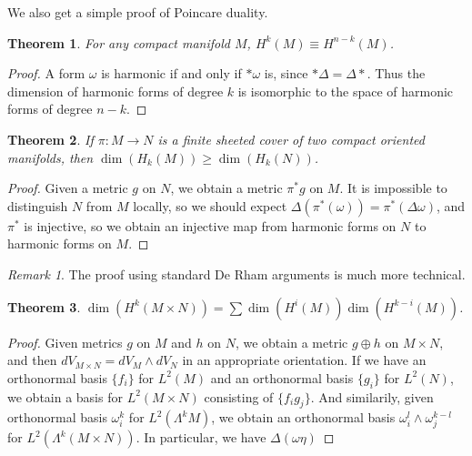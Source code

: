 \documentclass{article}
\theoremstyle{plain}
\newtheorem{theorem}{Theorem}
\theoremstyle{remark}
\newtheorem*{remark}{Remark}
\theoremstyle{definition}
\begin{document}
We also get a simple proof of Poincare duality.

\begin{theorem}
    For any compact manifold $M$, $H^k(M) \equiv H^{n-k}(M)$.
\end{theorem}
\begin{proof}
    A form $\omega$ is harmonic if and only if $* \omega$ is, since $* \Delta = \Delta *$. Thus the dimension of harmonic forms of degree $k$ is isomorphic to the space of harmonic forms of degree $n-k$.
\end{proof}

\begin{theorem}
    If $\pi: M \to N$ is a finite sheeted cover of two compact oriented manifolds, then $\dim(H_k(M)) \geq \dim(H_k(N))$.
\end{theorem}
\begin{proof}
    Given a metric $g$ on $N$, we obtain a metric $\pi^* g$ on $M$. It is impossible to distinguish $N$ from $M$ locally, so we should expect $\Delta(\pi^*(\omega)) = \pi^*(\Delta \omega)$, and $\pi^*$ is injective, so we obtain an injective map from harmonic forms on $N$ to harmonic forms on $M$.
\end{proof}

\begin{remark}
    The proof using standard De Rham arguments is much more technical.
\end{remark}

\begin{theorem}
    $\dim(H^k(M \times N)) = \sum \dim(H^i(M)) \dim(H^{k-i}(M))$.
\end{theorem}
\begin{proof}
    Given metrics $g$ on $M$ and $h$ on $N$, we obtain a metric $g \oplus h$ on $M \times N$, and then $dV_{M \times N} = dV_M \wedge dV_N$ in an appropriate orientation. If we have an orthonormal basis $\{ f_i \}$ for $L^2(M)$ and an orthonormal basis $\{ g_i \}$ for $L^2(N)$, we obtain a basis for $L^2(M \times N)$ consisting of $\{ f_ig_j \}$. And similarily, given orthonormal basis $\omega_i^k$ for $L^2(\Lambda^k M)$, we obtain an orthonormal basis $\omega_i^l \wedge \omega_j^{k-l}$ for $L^2(\Lambda^k(M \times N))$. In particular, we have $\Delta(\omega \eta)$
\end{proof}
\end{document}
